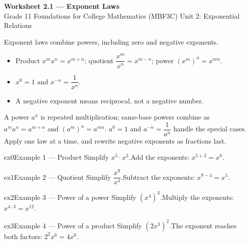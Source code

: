 \documentclass[11pt]{article}
\begin{document}
\begin{center}
{\LARGE\bfseries\color{titleblue}Worksheet 2.1 --- Exponent Laws}\\[2pt]
{\small Grade 11 Foundations for College Mathematics (MBF3C) \textperiodcentered{} Unit 2: Exponential Relations}
\end{center}

\begin{ideabox}
Exponent laws combine powers, including zero and negative exponents.
\begin{itemize}[leftmargin=*,itemsep=2pt]
  \item Product $x^m x^n=x^{m+n}$; quotient $\dfrac{x^m}{x^n}=x^{m-n}$; power $(x^m)^n=x^{mn}$.
  \item $x^0=1$ and $x^{-n}=\dfrac{1}{x^n}$.
  \item A negative exponent means reciprocal, not a negative number.
\end{itemize}
\end{ideabox}

\begin{learnbox}
A power $a^n$ is repeated multiplication; same-base powers combine as $a^m a^n=a^{m+n}$ and $(a^m)^n=a^{mn}$.
$a^0=1$ and $a^{-n}=\dfrac{1}{a^n}$ handle the special cases.
Apply one law at a time, and rewrite negative exponents as fractions last.
\end{learnbox}


\begin{example}{ex0}{Example 1 --- Product}
Simplify $x^5\cdot x^3$.\soln Add the exponents: $x^{5+3}=x^8$.
\end{example}

\begin{example}{ex1}{Example 2 --- Quotient}
Simplify $\dfrac{x^9}{x^4}$.\soln Subtract the exponents: $x^{9-4}=x^5$.
\end{example}

\begin{example}{ex2}{Example 3 --- Power of a power}
Simplify $(x^4)^3$.\soln Multiply the exponents: $x^{4\cdot3}=x^{12}$.
\end{example}

\begin{example}{ex3}{Example 4 --- Power of a product}
Simplify $(2x^3)^2$.\soln The exponent reaches both factors: $2^2 x^{6}=4x^6$.
\end{example}
\end{document}
